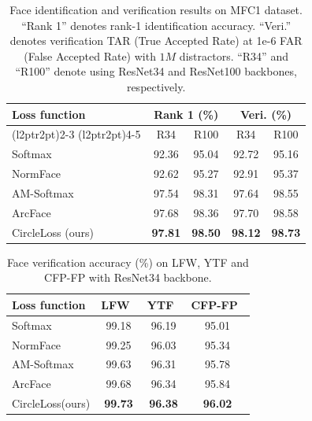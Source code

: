 \documentclass[10pt,twocolumn,letterpaper]{article}
\begin{document}
\begin{table}[t]
    \small
    \centering
    \caption{Face identification and verification results on MFC1 dataset. ``Rank 1'' denotes rank-1 identification accuracy. ``Veri.'' denotes verification TAR (True Accepted Rate) at 1e-6 FAR (False Accepted Rate) with $1M$ distractors. ``R34'' and ``R100'' denote using ResNet34 and ResNet100 backbones, respectively.}
    \label{tab:mf1}
    \begin{tabularx}{\linewidth}{Xcccc}
    \toprule
     \multirow{2}{*}{Loss function} & \multicolumn{2}{c}{Rank 1 (\%)} &
     \multicolumn{2}{c}{Veri. (\%)}\\
    \cmidrule(l{2pt}r{2pt}){2-3} \cmidrule(l{2pt}r{2pt}){4-5}
     & R34 & R100 &R34 & R100  \\
     \midrule
     
    Softmax &92.36 &95.04& 92.72 &95.16 \\
    NormFace~\cite{wang2017normface} &92.62  &95.27 &92.91 &95.37 \\
    AM-Softmax~\cite{wang2018additive,Wang_2018_CVPR} &97.54 &98.31 & 97.64 &98.55 \\
    ArcFace~\cite{deng2019arcface} &97.68 & 98.36 &97.70 &98.58 \\
    CircleLoss (ours) &\textbf{97.81} &\textbf{98.50}&\textbf{98.12} &\textbf{98.73} \\
    \bottomrule
    \end{tabularx}
\end{table}
\begin{table}[t]
    \small
    \centering
    \caption{Face verification accuracy (\%) on LFW, YTF and CFP-FP with ResNet34 backbone.}
    \label{tab:face-verif}
    \begin{tabularx}{\linewidth}{lccc}
    \toprule
     Loss function & LFW~\cite{LFWTech}& YTF~\cite{wolf2011face} & CFP-FP~\cite{cfp-paper} \\
     \midrule
    Softmax &99.18 & 96.19& 95.01\\
    NormFace~\cite{wang2017normface} & 99.25 & 96.03 & 95.34\\
    AM-Softmax~\cite{wang2018additive,Wang_2018_CVPR} & 99.63 & 96.31 & 95.78 \\
    ArcFace~\cite{deng2019arcface} & 99.68 & 96.34 & 95.84\\
    CircleLoss(ours) & \textbf{99.73} & \textbf{96.38} & \textbf{96.02} \\
    \bottomrule
    \end{tabularx}
\end{table}
\end{document}
